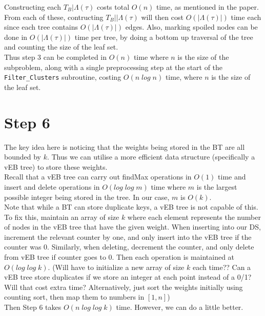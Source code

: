 \documentclass[a4paper]{article}
\begin{document}
    Constructing each $T_B|\Lambda(\tau)$ costs total $O(n)$ time, as mentioned in the paper. From each of these, contructing $T_B||\Lambda(\tau)$ will then cost $O(|\Lambda(\tau)|)$ time each since each tree contains $O(|\Lambda(\tau)|)$ edges. Also, marking spoiled nodes can be done in $O(|\Lambda(\tau)|)$ time per tree, by doing a bottom up traversal of the tree and counting the size of the leaf set.\\

    Thus step 3 can be completed in $O(n)$ time where $n$ is the size of the subproblem, along with a single preprocessing step at the start of the \texttt{Filter\_Clusters} subroutine, costing $O(n\;log\;n)$ time, where $n$ is the size of the leaf set.

    \section{Step 6}

    The key idea here is noticing that the weights being stored in the BT are all bounded by $k$. Thus we can utilise a more efficient data structure (specifically a vEB tree) to store these weights.\\

    Recall that a vEB tree can carry out findMax operations in $O(1)$ time and insert and delete operations in $O(log\;log\;m)$ time where $m$ is the largest possible integer being stored in the tree. In our case, $m$ is $O(k)$.\\

    Note that while a BT can store duplicate keys, a vEB tree is not capable of this. To fix this, maintain an array of size $k$ where each element represents the number of nodes in the vEB tree that have the given weight. When inserting into our DS, increment the relevant counter by one, and only insert into the vEB tree if the counter was $0$. Similarly, when deleting, decrement the counter, and only delete from vEB tree if counter goes to $0$. Then each operation is maintained at $O(log\;log\;k)$. (Will have to initialize a new array of size $k$ each time?? Can a vEB tree store duplicates if we store an integer at each point instead of a 0/1? Will that cost extra time? Alternatively, just sort the weights initially using counting sort, then map them to numbers in $[1, n]$)\\

    Then Step 6 takes $O(n\;log\;log\;k)$ time. However, we can do a little better.\\
\end{document}
